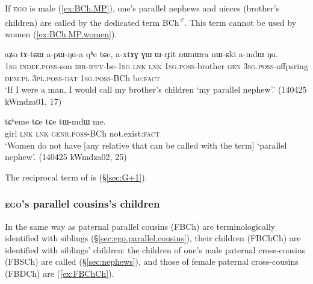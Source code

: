 If \textsc{ego} is male (\ref{ex:BCh.MP}), one's parallel nephews and nieces (brother's children) are called by the dedicated term  BCh\textsuperscript{♂}. This term cannot be used by women (\ref{ex:BCh.MP.women}). 

\begin{exe}
\ex \label{ex:BCh.MP}
\gll  aʑo tɤ-tɕɯ a-pɯ-ŋu-a qʰe tɕe, a-xtɤɣ ɣɯ ɯ-rɟit nɯnɯra nɯ-ɕki a-mdɯ ŋu. \\
\textsc{1sg} \textsc{indef}.\textsc{poss}-son \textsc{irr}-\textsc{ipfv}-be-\textsc{1sg} \textsc{lnk} \textsc{lnk} \textsc{1sg}.\textsc{poss}-brother \textsc{gen} \textsc{3sg}.\textsc{poss}-offpsring \textsc{dem}:\textsc{pl} \textsc{3pl}.\textsc{poss}-\textsc{dat} \textsc{1sg}.\textsc{poss}-BCh be:\textsc{fact} \\
\glt `If I were a man, I would call my brother's children  `my parallel nephew'.' (140425 kWmdza01, 17)
\end{exe}


\begin{exe}
\ex \label{ex:BCh.MP.women}
\gll tɕʰeme tɕe tɕe tɯ-mdɯ me. \\
girl \textsc{lnk} \textsc{lnk} \textsc{genr}.\textsc{poss}-BCh not.exist:\textsc{fact} \\
\glt `Women do not have [any relative that can be called with the term]  `parallel nephew'. (140425 kWmdza02, 25)
\end{exe}

The reciprocal term of  is  (§\ref{sec:G+1}).

\subsubsection{\textsc{ego}'s parallel cousins's children} \label{sec:FBCh.MZCh.Ch}
In the same way as paternal parallel cousins (FBCh) are terminologically identified with siblings (§\ref{sec:ego.parallel.cousins}), their children (FBChCh) are identified with siblings' children: the children of one's male paternal cross-cousins (FBSCh) are called  (§\ref{sec:nephews}), and those of female paternal cross-cousins (FBDCh) are  (\ref{ex:FBChCh}).

